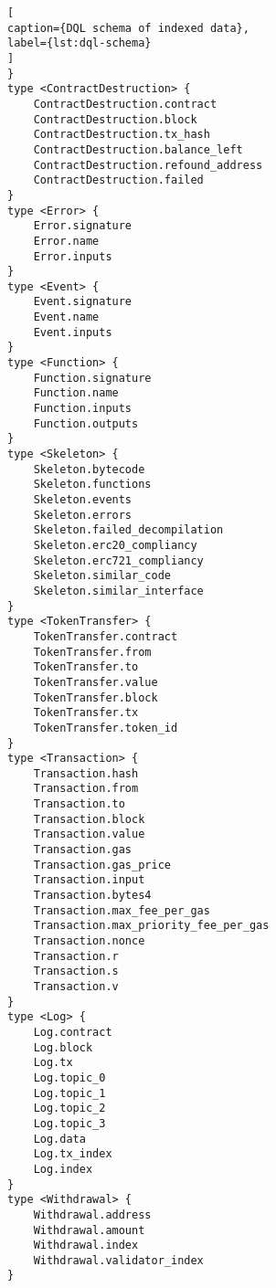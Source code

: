 \begin{lstlisting}[
caption={DQL schema of indexed data},
label={lst:dql-schema}
]
}
type <ContractDestruction> {
	ContractDestruction.contract
	ContractDestruction.block
	ContractDestruction.tx_hash
	ContractDestruction.balance_left
	ContractDestruction.refound_address
	ContractDestruction.failed
}
type <Error> {
	Error.signature
	Error.name
	Error.inputs
}
type <Event> {
	Event.signature
	Event.name
	Event.inputs
}
type <Function> {
	Function.signature
	Function.name
	Function.inputs
	Function.outputs
}
type <Skeleton> {
	Skeleton.bytecode
	Skeleton.functions
	Skeleton.events
	Skeleton.errors
	Skeleton.failed_decompilation
	Skeleton.erc20_compliancy
	Skeleton.erc721_compliancy
	Skeleton.similar_code
	Skeleton.similar_interface
}
type <TokenTransfer> {
	TokenTransfer.contract
	TokenTransfer.from
	TokenTransfer.to
	TokenTransfer.value
	TokenTransfer.block
	TokenTransfer.tx
	TokenTransfer.token_id
}
type <Transaction> {
	Transaction.hash
	Transaction.from
	Transaction.to
	Transaction.block
	Transaction.value
	Transaction.gas
	Transaction.gas_price
	Transaction.input
	Transaction.bytes4
	Transaction.max_fee_per_gas
	Transaction.max_priority_fee_per_gas
	Transaction.nonce
	Transaction.r
	Transaction.s
	Transaction.v
}
type <Log> {
	Log.contract
	Log.block
	Log.tx
	Log.topic_0
	Log.topic_1
	Log.topic_2
	Log.topic_3
	Log.data
	Log.tx_index
	Log.index
}
type <Withdrawal> {
	Withdrawal.address
	Withdrawal.amount
	Withdrawal.index
	Withdrawal.validator_index
}
\end{lstlisting}

